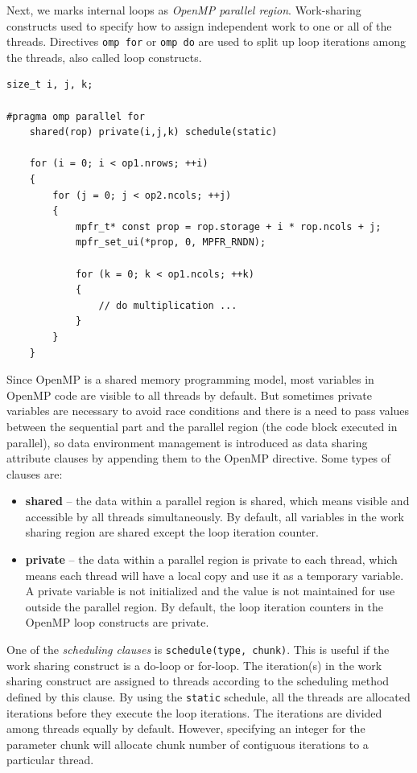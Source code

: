 \documentclass[runningheads,a4paper]{llncs}
\begin{document}
Next, we marks internal loops as \textit{OpenMP parallel region}. Work-sharing constructs used to specify how to assign independent work to one or all of the threads. Directives \texttt{omp for} or \texttt{omp do} are used to split up loop iterations among the threads, also called loop constructs.

\begin{verbatim}
size_t i, j, k;

#pragma omp parallel for
    shared(rop) private(i,j,k) schedule(static)
    
    for (i = 0; i < op1.nrows; ++i)
    {
        for (j = 0; j < op2.ncols; ++j)
        {
            mpfr_t* const prop = rop.storage + i * rop.ncols + j;	
            mpfr_set_ui(*prop, 0, MPFR_RNDN);
            
            for (k = 0; k < op1.ncols; ++k)
            {
                // do multiplication ...
            }
        }
    }
\end{verbatim}

Since OpenMP is a shared memory programming model, most variables in OpenMP code are visible to all threads by default. But sometimes private variables are necessary to avoid race conditions and there is a need to pass values between the sequential part and the parallel region (the code block executed in parallel), so data environment management is introduced as data sharing attribute clauses by appending them to the OpenMP directive. Some types of clauses are:

\begin{itemize}
\item\textbf{shared} -- the data within a parallel region is shared, which means visible and accessible by all threads simultaneously. By default, all variables in the work sharing region are shared except the loop iteration counter.

\item\textbf{private} -- the data within a parallel region is private to each thread, which means each thread will have a local copy and use it as a temporary variable. A private variable is not initialized and the value is not maintained for use outside the parallel region. By default, the loop iteration counters in the OpenMP loop constructs are private.
\end{itemize}

One of the \textit{scheduling clauses} is \texttt{schedule(type, chunk)}. This is useful if the work sharing construct is a do-loop or for-loop. The iteration(s) in the work sharing construct are assigned to threads according to the scheduling method defined by this clause. By using the \texttt{static} schedule, all the threads are allocated iterations before they execute the loop iterations. The iterations are divided among threads equally by default. However, specifying an integer for the parameter chunk will allocate chunk number of contiguous iterations to a particular thread.
\end{document}
